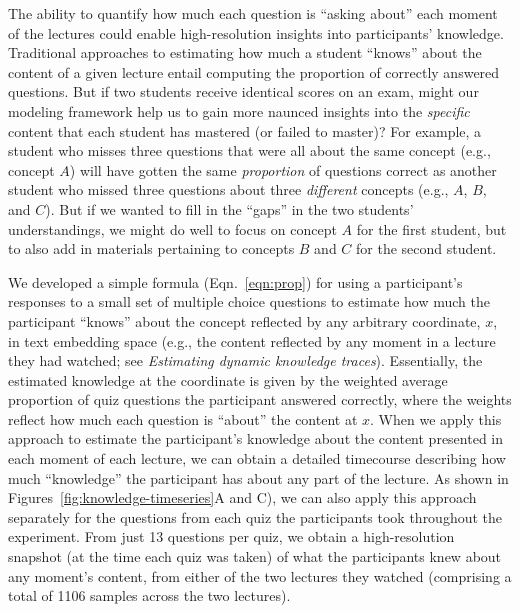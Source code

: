 \documentclass[10pt]{article}
\begin{document}
The ability to quantify how much each question is ``asking about'' each moment
of the lectures could enable high-resolution insights into participants'
knowledge. Traditional approaches to estimating how much a student ``knows''
about the content of a given lecture entail computing the proportion of
correctly answered questions. But if two students receive identical scores on
an exam, might our modeling framework help us to gain more naunced insights
into the \textit{specific} content that each student has mastered (or failed to
master)? For example, a student who misses three questions that were all about
the same concept (e.g., concept $A$) will have gotten the same
\textit{proportion} of questions correct as another student who missed three
questions about three \textit{different} concepts (e.g., $A$, $B$, and $C$).
But if we wanted to fill in the ``gaps'' in the two students' understandings,
we might do well to focus on concept $A$ for the first student, but to also add
in materials pertaining to concepts $B$ and $C$ for the second student.

We developed a simple formula (Eqn.~\ref{eqn:prop}) for using a participant's
responses to a small set of multiple choice questions to estimate how much the
participant ``knows'' about the concept reflected by any arbitrary coordinate,
$x$, in text embedding space (e.g., the content reflected by any moment in a
lecture they had watched; see \textit{Estimating dynamic knowledge traces}).
Essentially, the estimated knowledge at the coordinate is given by the weighted
average proportion of quiz questions the participant answered correctly, where
the weights reflect how much each question is ``about'' the content at $x$.
When we apply this approach to estimate the participant's knowledge about the
content presented in each moment of each lecture, we can obtain a detailed
timecourse describing how much ``knowledge'' the participant has about any part
of the lecture. As shown in Figures~\ref{fig:knowledge-timeseries}A and C), we
can also apply this approach separately for the questions from each quiz the
participants took throughout the experiment. From just 13 questions per quiz,
we obtain a high-resolution snapshot (at the time each quiz was taken) of what
the participants knew about any moment's content, from either of the two
lectures they watched (comprising a total of 1106 samples across the two
lectures).
\end{document}
